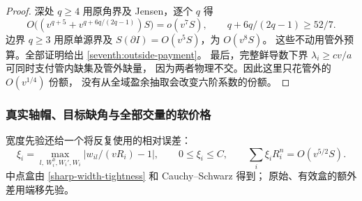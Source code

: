 \begin{proof}
深处 \(q\ge4\) 用原角界及 Jensen，逐个 \(q\) 得
\[
 O\bigl((v^{q+5}+v^{q+6q/(2q-1)})S\bigr)=o(v^7S),
 \qquad q+6q/(2q-1)\ge52/7.
\]
边界 \(q\ge3\) 用原单源界及 \(S(\partial I)=O(v^5S)\)，为 \(O(v^8S)\)。
这些不动用管外预算。全部证明给出 \eqref{seventh:outside-payment}。
最后，完整鲜导数下界 \(\lambda_i\ge cv/a\) 可同时支付管内缺集及管外缺量，
因为两者物理不交。因此这里只花管外的 \(O(v^{1/4})\) 份额，
没有从全域盈余抽取会改变六阶系数的份额。
\end{proof}

\subsubsection{真实轴帽、目标缺角与全部交量的软价格}

宽度先验还给一个将反复使用的相对误差：
\[
 \xi_i=\max_{l,\ W_i^0,W_i',W_i}|w_{il}/(vR_i)-1|,
 \qquad 0\le\xi_i\le C,\qquad \sum_i\xi_iR_i^n=O(v^{5/2}S).
\]
中点盒由 \eqref{sharp-width-tightness} 和 Cauchy--Schwarz 得到；
原始、有效盒的额外差用端移先验。

